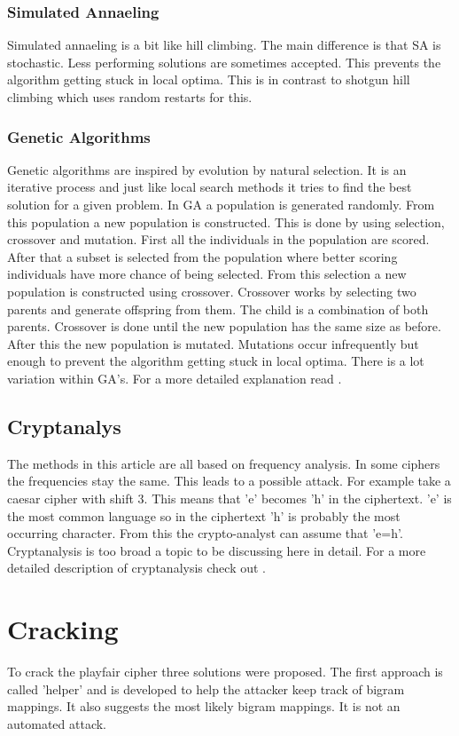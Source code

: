 \documentclass[]{article}
\begin{document}
\subsubsection{Simulated Annaeling}
Simulated annaeling is a bit like hill climbing. The main difference is that SA is stochastic. Less performing solutions are sometimes accepted. This prevents the algorithm getting stuck in local optima. 
This is in contrast to shotgun hill climbing which uses random restarts for this. 
\subsubsection{Genetic Algorithms}
Genetic algorithms are inspired by evolution by natural selection. It is an iterative process and just like local search methods it tries to find the best solution for a given problem. In GA a population is generated randomly. From this population a new population is constructed. This is done by using selection, crossover and mutation. First all the individuals in the population are scored. After that a subset is selected from the population where better scoring individuals have more chance of being selected. From this selection a new population is constructed using crossover. Crossover works by selecting two parents and generate offspring from them. The child is a combination of both parents. Crossover is done until the new population has the same size as before. After this the new population is mutated. Mutations occur infrequently but enough to prevent the algorithm getting stuck in local optima. There is a lot variation within GA's. For a more detailed explanation read \cite{}.
\subsection{Cryptanalys}
The methods in this article are all based on frequency analysis. In some ciphers the frequencies stay the same. This leads to a possible attack. For example take a caesar cipher with shift 3. This means that 'e' becomes 'h' in the ciphertext. 'e' is the most common language so in the ciphertext 'h' is probably the most occurring character. From this the crypto-analyst can assume that 'e=h'. 
Cryptanalysis is too broad a topic to be discussing here in detail. For a more detailed description of cryptanalysis check out \cite{}. 
\section{Cracking}
To crack the playfair cipher three solutions were proposed. The first approach is called 'helper' and is developed to help the attacker keep track of bigram mappings. It also suggests the most likely bigram mappings. It is not an automated attack.
\end{document}
